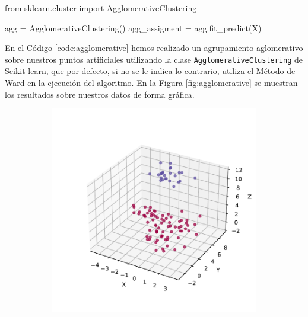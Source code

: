 \begin{mypython}[float={h}, caption={Agrupamiento aglomerativo.}, label={code:agglomerative}]
  from sklearn.cluster import AgglomerativeClustering

  agg = AgglomerativeClustering()
  agg_assigment = agg.fit_predict(X)
\end{mypython}

En el Código \ref{code:agglomerative} hemos realizado un agrupamiento aglomerativo sobre nuestros puntos artificiales utilizando la clase \texttt{AgglomerativeClustering} de Scikit-learn, que por defecto, si no se le indica lo contrario, utiliza el Método de Ward en la ejecución del algoritmo. En la Figura \ref{fig:agglomerative} se muestran los resultados sobre nuestros datos de forma gráfica.

\begin{figure}[h]
  \centering
  \begin{subfigure}{0.45\textwidth}
    \centering
    \includegraphics[width=\textwidth]{figures/agglomerative-3d.pdf}
    \caption{}
    \label{fig:agg-3d}
  \end{subfigure}
  \begin{subfigure}{0.45\textwidth}
    \centering

\end{subfigure}
\end{figure}
